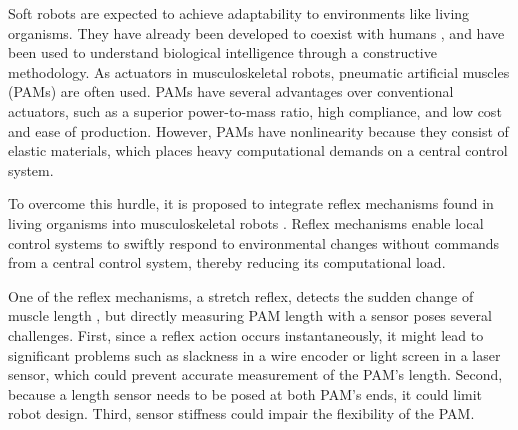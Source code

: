 Soft robots are expected to achieve adaptability to environments like living organisms\cite{rus_design_2015}. 
They have already been developed to coexist with humans \cite{Compac,polygerinos_soft_2015}, and have been used to understand biological intelligence through a constructive methodology\cite{hosoda,marchese_autonomous}.
As actuators in musculoskeletal robots, pneumatic artificial muscles (PAMs) are often used\cite{mirvakili_artificial}.
PAMs have several advantages over conventional actuators, such as a superior power-to-mass ratio\cite{Dynamic}, high compliance\cite{SDCharacteristics}, and low cost and ease of production\cite{ashwin_survey_2018}.
However, PAMs have nonlinearity because they consist of elastic materials, which places heavy computational demands on a central control system.

To overcome this hurdle, it is proposed to integrate reflex mechanisms found in living organisms into musculoskeletal robots \cite{takahashi}.
Reflex mechanisms enable local control systems to swiftly respond to environmental changes without commands from a central control system, thereby reducing its computational load. 

One of the reflex mechanisms, a stretch reflex, detects the sudden change of muscle length \cite{kandel}, but directly measuring PAM length with a sensor poses several challenges\cite{nakajima}.
First, since a reflex action occurs instantaneously, it might lead to significant problems such as slackness in a wire encoder or light screen in a laser sensor, 
which could prevent accurate measurement of the PAM's length. 
Second, because a length sensor needs to be posed at both PAM's ends, it could limit robot design. 
Third, sensor stiffness could impair the flexibility of the PAM.

